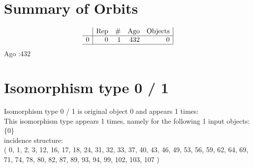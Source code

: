 \section*{Summary of Orbits}
$$
\begin{array}{r|*{4}{r}|}
 & \mbox{Rep} & \# & \mbox{Ago} & \mbox{Objects}\\
\hline
0 & 0 & 1 & 432 & 0\\
\hline
\end{array}
$$
Ago :$432$ \\
\section*{Isomorphism type 0 / 1}
Isomorphism type 0 / 1 is original object 0 and appears 1 times: \\
This isomorphism type appears 1 times, namely for the following 1 input objects: 
$
\{ 0 \}$\\
incidence structure: \\
( 0, 1, 2, 3, 12, 16, 17, 18, 24, 31, 32, 33, 37, 40, 43, 46, 49, 53, 56, 59, 62, 64, 69, 71, 74, 78, 80, 82, 87, 89, 93, 94, 99, 102, 103, 107 )\\
